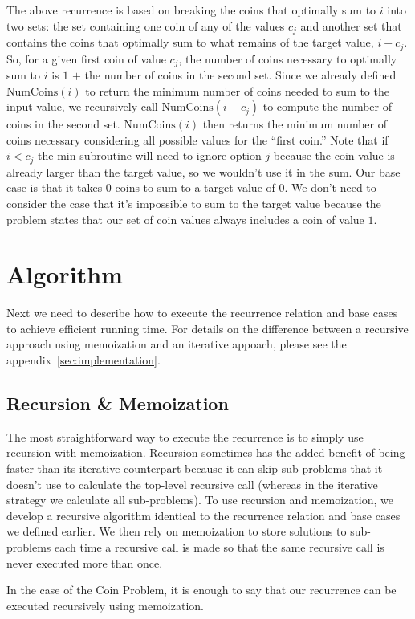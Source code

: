 \documentclass[11pt]{article}
\begin{document}
The above recurrence is based on breaking the coins that optimally sum to $i$ into two sets: the set containing one coin of any of the values $c_j$ and another set that contains the coins that optimally sum to what remains of the target value, $i - c_j$. So, for a given first coin of value $c_j$, the number of coins necessary to optimally sum to $i$ is $1$ $+$ the number of coins in the second set. Since we already defined $\mathrm{NumCoins}(i)$ to return the minimum number of coins needed to sum to the input value, we recursively call $\mathrm{NumCoins}(i - c_j)$ to compute the number of coins in the second set. $\mathrm{NumCoins}(i)$ then returns the minimum number of coins necessary considering all possible values for the ``first coin.'' Note that if $i < c_j$ the $\mathrm{min}$ subroutine will need to ignore option $j$ because the coin value is already larger than the target value, so we wouldn't use it in the sum. Our base case is that it takes $0$ coins to sum to a target value of $0$. We don't need to consider the case that it's impossible to sum to the target value because the problem states that our set of coin values always includes a coin of value $1$.

\section{Algorithm}
Next we need to describe how to execute the recurrence relation and base cases to achieve efficient running time. For details on the difference between a recursive approach using memoization and an iterative appoach, please see the appendix~\ref{sec:implementation}.
\subsection*{Recursion \& Memoization}
The most straightforward way to execute the recurrence is to simply use recursion with memoization. Recursion sometimes has the added benefit of being faster than its iterative counterpart because it can skip sub-problems that it doesn't use to calculate the top-level recursive call (whereas in the iterative strategy we calculate all sub-problems). To use recursion and memoization, we develop a recursive algorithm identical to the recurrence relation and base cases we defined earlier. We then rely on memoization to store solutions to sub-problems each time a recursive call is made so that the same recursive call is never executed more than once.

In the case of the Coin Problem, it is enough to say that our recurrence can be executed recursively using memoization.
\end{document}
